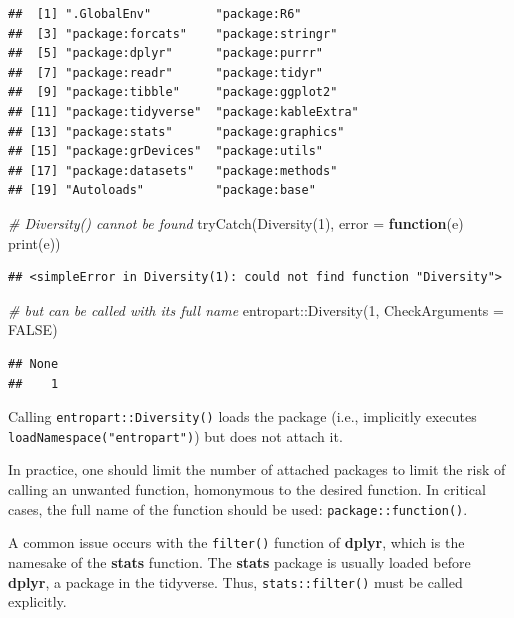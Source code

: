 \documentclass[
  12pt,
  american,
  a4paper,
  extrafontsizes,onecolumn,openright
  ]{memoir}
\newenvironment{Shaded}{\begin{snugshade}}{\end{snugshade}}
\newcommand{\AttributeTok}[1]{\textcolor[rgb]{0.77,0.63,0.00}{#1}}
\newcommand{\CommentTok}[1]{\textcolor[rgb]{0.56,0.35,0.01}{\textit{#1}}}
\newcommand{\ConstantTok}[1]{\textcolor[rgb]{0.00,0.00,0.00}{#1}}
\newcommand{\ControlFlowTok}[1]{\textcolor[rgb]{0.13,0.29,0.53}{\textbf{#1}}}
\newcommand{\DecValTok}[1]{\textcolor[rgb]{0.00,0.00,0.81}{#1}}
\newcommand{\FunctionTok}[1]{\textcolor[rgb]{0.00,0.00,0.00}{#1}}
\newcommand{\NormalTok}[1]{#1}
\newcommand{\SpecialCharTok}[1]{\textcolor[rgb]{0.00,0.00,0.00}{#1}}
\begin{document}
\begin{verbatim}
##  [1] ".GlobalEnv"         "package:R6"        
##  [3] "package:forcats"    "package:stringr"   
##  [5] "package:dplyr"      "package:purrr"     
##  [7] "package:readr"      "package:tidyr"     
##  [9] "package:tibble"     "package:ggplot2"   
## [11] "package:tidyverse"  "package:kableExtra"
## [13] "package:stats"      "package:graphics"  
## [15] "package:grDevices"  "package:utils"     
## [17] "package:datasets"   "package:methods"   
## [19] "Autoloads"          "package:base"
\end{verbatim}

\begin{Shaded}
\begin{Highlighting}[]
\CommentTok{\# Diversity() cannot be found}
\FunctionTok{tryCatch}\NormalTok{(}\FunctionTok{Diversity}\NormalTok{(}\DecValTok{1}\NormalTok{), }\AttributeTok{error =} \ControlFlowTok{function}\NormalTok{(e) }\FunctionTok{print}\NormalTok{(e))}
\end{Highlighting}
\end{Shaded}

\begin{verbatim}
## <simpleError in Diversity(1): could not find function "Diversity">
\end{verbatim}

\begin{Shaded}
\begin{Highlighting}[]
\CommentTok{\# but can be called with its full name}
\NormalTok{entropart}\SpecialCharTok{::}\FunctionTok{Diversity}\NormalTok{(}\DecValTok{1}\NormalTok{, }\AttributeTok{CheckArguments =} \ConstantTok{FALSE}\NormalTok{)}
\end{Highlighting}
\end{Shaded}

\begin{verbatim}
## None 
##    1
\end{verbatim}

\normalsize

Calling \texttt{entropart::Diversity()} loads the package (i.e., implicitly executes \texttt{loadNamespace("entropart")}) but does not attach it.

In practice, one should limit the number of attached packages to limit the risk of calling an unwanted function, homonymous to the desired function.
In critical cases, the full name of the function should be used: \texttt{package::function()}.

A common issue occurs with the \texttt{filter()} function of \textbf{dplyr}, which is the namesake of the \textbf{stats} function.
The \textbf{stats} package is usually loaded before \textbf{dplyr}, a package in the tidyverse.
Thus, \texttt{stats::filter()} must be called explicitly.
\end{document}
